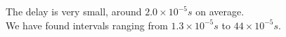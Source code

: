 The delay is very small, around $ 2.0 \times 10^{-5} s $ on average.\\
 We have found intervals ranging from $ 1.3 \times 10^{-5} s $ to $ 44 \times 10^{-5} s $.
